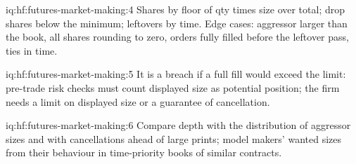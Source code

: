 \begin{solution}{iq:hf:futures-market-making:4}
Shares by floor of qty times size over total; drop shares below the minimum; leftovers by time. Edge cases: aggressor larger than the book, all
shares rounding to zero, orders fully filled before the leftover pass, ties in time.
\end{solution}

\begin{solution}{iq:hf:futures-market-making:5}
It is a breach if a full fill would exceed the limit: pre-trade risk checks must count displayed size as potential position; the firm needs a
limit on displayed size or a guarantee of cancellation.
\end{solution}

\begin{solution}{iq:hf:futures-market-making:6}
Compare depth with the distribution of aggressor sizes and with cancellations ahead of large prints; model makers' wanted sizes from their
behaviour in time-priority books of similar contracts.
\end{solution}
